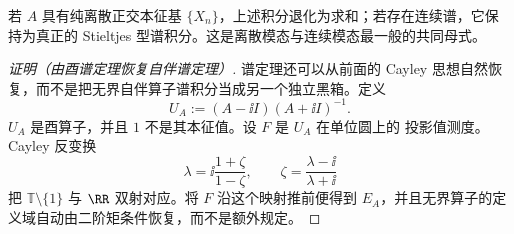 若 $A$ 具有纯离散正交本征基 $\{X_n\}$，上述积分退化为求和；若存在连续谱，它保持为真正的 Stieltjes 型谱积分。这是离散模态与连续模态最一般的共同母式。

\begin{proof}[证明（由酉谱定理恢复自伴谱定理）]
谱定理还可以从前面的 Cayley 思想自然恢复，而不是把无界自伴算子谱积分当成另一个独立黑箱。定义
\begin{equation}\label{eq:math-sl-cayley-selfadjoint}
 U_A:=(A-\ii I)(A+\ii I)^{-1}.
\end{equation}
$U_A$ 是酉算子，并且 $1$ 不是其本征值。设 $F$ 是 $U_A$ 在单位圆上的 投影值测度。Cayley 反变换
\[
 \lambda=\ii\frac{1+\zeta}{1-\zeta},
 \qquad
 \zeta=\frac{\lambda-\ii}{\lambda+\ii}
\]
把 $\mathbb T\setminus\{1\}$ 与 $\RR$ 双射对应。将 $F$ 沿这个映射推前便得到 $E_A$，并且无界算子的定义域自动由二阶矩条件恢复，而不是额外规定。
\end{proof}

